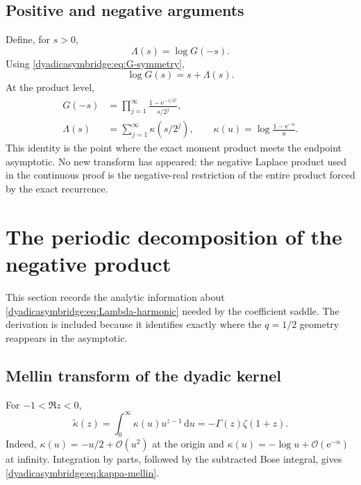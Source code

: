 \documentclass[11pt,oneside]{article}
\theoremstyle{definition}
\theoremstyle{remark}
\newcommand{\e}{\mathrm e}
\newcommand{\dd}{\,\mathrm d}
\newcommand{\bigO}{\mathcal O}
\begin{document}
\subsection{Positive and negative arguments}

Define, for $s>0$,
\begin{equation}
 \Lambda(s)=\log G(-s).
\label{dyadicasymbridge:eq:Lambda-def}
\end{equation}
Using \eqref{dyadicasymbridge:eq:G-symmetry},
\begin{equation}
 \log G(s)=s+\Lambda(s).
\label{dyadicasymbridge:eq:positive-negative-log}
\end{equation}
At the product level,
\begin{align}
 G(-s)
 &=\prod_{j=1}^{\infty}
 \frac{1-\e^{-s/2^j}}{s/2^j},                              \label{dyadicasymbridge:eq:negative-product}\\
 \Lambda(s)
 &=\sum_{j=1}^{\infty}\kappa(s/2^j),
 \qquad
 \kappa(u)=\log\frac{1-\e^{-u}}u.                         \label{dyadicasymbridge:eq:Lambda-harmonic}
\end{align}
This identity is the point where the exact moment product meets the endpoint asymptotic.  No new transform has appeared: the negative Laplace product used in the continuous proof is the negative-real restriction of the entire product forced by the exact recurrence.

\section{The periodic decomposition of the negative product}
\label{dyadicasymbridge:sec:periodic-decomposition}

This section records the analytic information about \eqref{dyadicasymbridge:eq:Lambda-harmonic} needed by the coefficient saddle.  The derivation is included because it identifies exactly where the $q=1/2$ geometry reappears in the asymptotic.

\subsection{Mellin transform of the dyadic kernel}

For $-1<\Re z<0$,
\begin{equation}
 \widetilde\kappa(z)=\int_0^\infty\kappa(u)u^{z-1}\dd u
 =-\Gamma(z)\zeta(1+z).
\label{dyadicasymbridge:eq:kappa-mellin}
\end{equation}
Indeed, $\kappa(u)=-u/2+\bigO(u^2)$ at the origin and
$\kappa(u)=-\log u+\bigO(\e^{-u})$ at infinity.  Integration by parts, followed by the subtracted Bose integral, gives \eqref{dyadicasymbridge:eq:kappa-mellin}.
\end{document}
